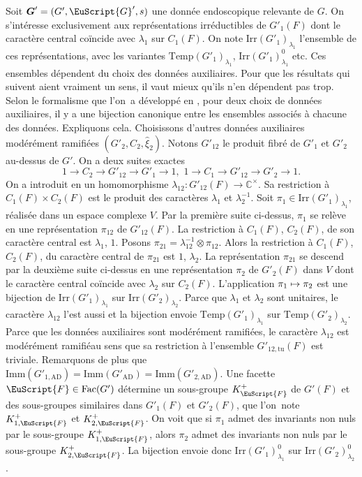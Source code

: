 \documentclass[JEP,XML,SOM,Unicode,francais]{cedram}
\let\mathcal \EuScript
\newcommand\mto{\mathchoice{\longmapsto}{\mapsto}{\mapsto}{\mapsto}}
\newcommand{\AD}{\mathrm{AD}}
\newcommand{\Fac}{\mathrm{Fac}}
\newcommand{\Imm}{\mathrm{Imm}}
\newcommand{\Irr}{\mathrm{Irr}}
\newcommand{\Temp}{\mathrm{Temp}}
\newcommand{\tu}{\mathrm{tu}}
\newcommand{\bG}{\boldsymbol{G}}
\newcommand{\cF}{\mathcal{F}}
\newcommand{\cG}{\mathcal{G}}
\newcommand{\CC}{\mathbb{C}}
\theoremstyle{plain}
\theoremstyle{definition}
\begin{document}
Soit $\bG'=(G',\cG',s)$ une donnée endoscopique relevante de $G$. On s'intéresse exclusivement aux représentations irréductibles de $G'_{1}(F)$ dont le caractère central coïncide avec $\lambda_{1}$ sur $C_{1}(F)$. On note $\Irr(G'_{1})_{\lambda_{1}}$ l'ensemble de ces représentations, avec les variantes $\Temp(G'_{1})_{\lambda_{1}}$, $\Irr(G'_{1})^0_{\lambda_{1}}$ etc. Ces ensembles dépendent du choix des données auxiliaires. Pour que les résultats qui suivent aient vraiment un sens, il vaut mieux qu'ils n'en dépendent pas trop. Selon le formalisme que l'on~a développé en \cite{MW}, pour deux choix de données auxiliaires, il y a une bijection canonique entre les ensembles associés à chacune des données. Expliquons cela.
Choisissons d'autres données auxiliaires modérément ramifiées $(G'_{2},C_{2},\hat{\xi}_{2})$. Notons $G'_{12}$ le produit fibré de $G'_{1}$ et $G'_{2}$ au-dessus de $G'$. On a deux suites exactes
\[
1\to C_{2}\to G'_{12}\to G'_{1}\to 1,\,\,1\to C_{1}\to G'_{12}\to G'_{2}\to 1.
\]
On a introduit en \cite[I.2.5]{MW} un homomorphisme $\lambda_{12}:G'_{12}(F)\to \CC^{\times}$. Sa restriction à $C_{1}(F)\times C_{2}(F)$ est le produit des caractères $\lambda_{1}$ et $\lambda_{2}^{-1}$. Soit $\pi_{1}\in \Irr(G'_{1})_{\lambda_{1}}$, réalisée dans un espace complexe $V$. Par la première suite ci-dessus, $\pi_{1}$ se relève en une représentation $\pi_{12}$ de $G'_{12}(F)$. La restriction à $C_{1}(F)$, \resp $C_{2}(F)$, de son carac\-tère central est $\lambda_{1}$, \resp $1$. Posons $\pi_{21}=\lambda_{12}^{-1}\otimes \pi_{12}$. Alors la restriction à $C_{1}(F)$, \resp $C_{2}(F)$, du caractère central de $\pi_{21}$ est $1$, \resp $\lambda_{2}$. La représentation $\pi_{21}$ se descend par la deuxième suite ci-dessus en une représentation $\pi_{2}$ de $G'_{2}(F)$ dans $V$ dont le caractère central coïncide avec $\lambda_{2}$ sur $C_{2}(F)$. L'application $\pi_{1}\mto \pi_{2}$ est une bijection de $\Irr(G'_{1})_{\lambda_{1}}$ sur $\Irr(G'_{2})_{\lambda_{2}}$. Parce que $\lambda_{1}$ et $\lambda_{2}$ sont unitaires, le caractère $\lambda_{12}$ l'est aussi et la bijection envoie $\Temp(G'_{1})_{\lambda_{1}}$ sur $\Temp(G'_{2})_{\lambda_{2}}$. Parce que les données auxiliaires sont modérément ramifiées, le caractère $\lambda_{12}$ est \og modérément ramifié\fg au sens que sa restriction à l'ensemble $G'_{12,\tu}(F)$ est triviale. Remarquons de plus que $\Imm(G'_{1,\AD})=\Imm(G'_{\AD})=\Imm(G'_{2,\AD})$. Une facette $\cF\in \Fac(G')$ détermine un sous-groupe $K_{\cF}^+$ de $G'(F)$ et des sous-groupes similaires dans $G'_{1}(F)$ et $G'_{2}(F)$, que l'on~note $K_{1,\cF}^+$ et $K_{2,\cF}^+$. On voit que si $\pi_{1}$ admet des invariants non nuls par le sous-groupe $K_{1,\cF}^{+}$, alors $\pi_{2}$ admet des invariants non nuls par le sous-groupe $K_{2,\cF}^{+}$. La bijection envoie donc $\Irr(G'_{1})^0_{\lambda_{1}}$ sur $\Irr(G'_{2})^0_{\lambda_{2}}$.
\end{document}
